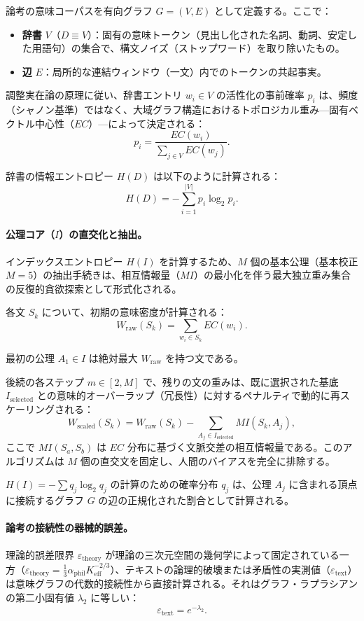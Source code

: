 \documentclass[11pt,a4paper]{article}
\begin{document}
	論考の意味コーパスを有向グラフ \(G = (V, E)\) として定義する。ここで：
	\begin{itemize}
		\item \textbf{辞書} \(V\)（\(D \equiv V\)）：固有の意味トークン（見出し化された名詞、動詞、安定した用語句）の集合で、構文ノイズ（ストップワード）を取り除いたもの。
		\item \textbf{辺} \(E\)：局所的な連結ウィンドウ（一文）内でのトークンの共起事実。
	\end{itemize}
	
	調整実在論の原理に従い、辞書エントリ \(w_i \in V\) の活性化の事前確率 \(p_i\) は、頻度（シャノン基準）ではなく、大域グラフ構造におけるトポロジカル重み—固有ベクトル中心性（\(EC\)）—によって決定される：
	\[
	p_{i} = \frac{EC(w_{i})}{\sum_{j \in V} EC(w_{j})}.
	\]
	
	辞書の情報エントロピー \(H(D)\) は以下のように計算される：
	\[
	H(D) = -\sum_{i=1}^{|V|} p_{i} \log_{2} p_{i}.
	\]
	
	\paragraph{公理コア（\(I\)）の直交化と抽出。}
	インデックスエントロピー \(H(I)\) を計算するため、\(M\) 個の基本公理（基本校正 \(M = 5\)）の抽出手続きは、相互情報量（\(MI\)）の最小化を伴う最大独立重み集合の反復的貪欲探索として形式化される。
	
	各文 \(S_{k}\) について、初期の意味密度が計算される：
	\[
	W_{\text{raw}}(S_k) = \sum_{w_i \in S_k} EC(w_i).
	\]
	
	最初の公理 \(A_1 \in I\) は絶対最大 \(W_{\text{raw}}\) を持つ文である。
	
	後続の各ステップ \(m \in [2, M]\) で、残りの文の重みは、既に選択された基底 \(I_{\text{selected}}\) との意味的オーバーラップ（冗長性）に対するペナルティで動的に再スケーリングされる：
	\[
	W_{\text{scaled}}(S_{k}) = W_{\text{raw}}(S_{k}) - \sum_{A_{j} \in I_{\text{selected}}} MI(S_{k}, A_{j}),
	\]
	ここで \(MI(S_a, S_b)\) は \(EC\) 分布に基づく文脈交差の相互情報量である。このアルゴリズムは \(M\) 個の直交文を固定し、人間のバイアスを完全に排除する。
	
	\(H(I) = -\sum q_j \log_2 q_j\) の計算のための確率分布 \(q_{j}\) は、公理 \(A_{j}\) に含まれる頂点に接続するグラフ \(G\) の辺の正規化された割合として計算される。
	
	\paragraph{論考の接続性の器械的誤差。}
	理論的誤差限界 \(\varepsilon_{\text{theory}}\) が理論の三次元空間の幾何学によって固定されている一方（\(\varepsilon_{\text{theory}} = \frac{1}{3} \alpha_{\text{phil}} K_{\text{eff}}^{-2/3}\)）、テキストの論理的破壊または矛盾性の実測値（\(\varepsilon_{\text{text}}\)）は意味グラフの代数的接続性から直接計算される。それはグラフ・ラプラシアンの第二小固有値 \(\lambda_{2}\) に等しい：
	\[
	\varepsilon_{\text{text}} = e^{-\lambda_{2}}.
	\]
	
\end{document}
